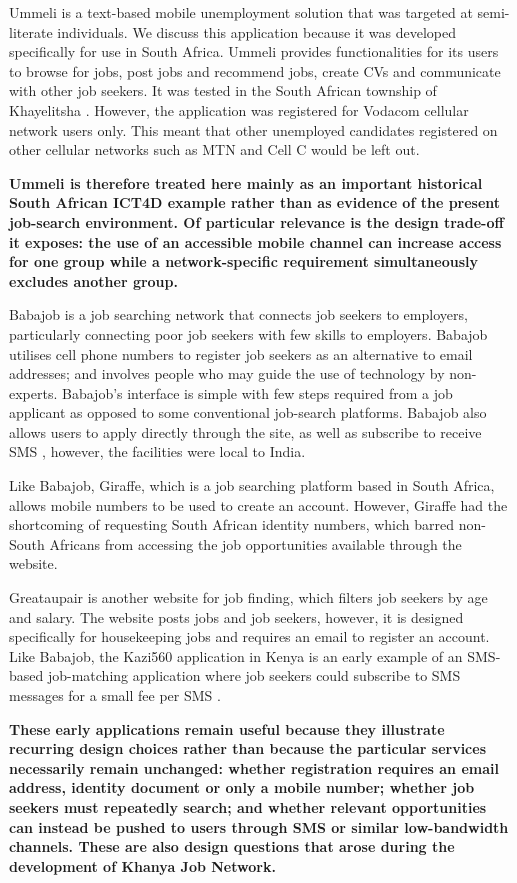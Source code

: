 Ummeli \cite{gitau2012} is a text-based mobile unemployment solution that was targeted at semi-literate individuals. We discuss this application because it was developed specifically for use in South Africa. Ummeli provides functionalities for its users to browse for jobs, post jobs and recommend jobs, create CVs and communicate with other job seekers. It was tested in the South African township of Khayelitsha \cite{gitau2012}. However, the application was registered for Vodacom cellular network users only. This meant that other unemployed candidates registered on other cellular networks such as MTN and Cell C would be left out.

\textbf{Ummeli is therefore treated here mainly as an important historical South African ICT4D example rather than as evidence of the present job-search environment. Of particular relevance is the design trade-off it exposes: the use of an accessible mobile channel can increase access for one group while a network-specific requirement simultaneously excludes another group.}

Babajob is a job searching network that connects job seekers to employers, particularly connecting poor job seekers with few skills to employers. Babajob utilises cell phone numbers to register job seekers as an alternative to email addresses; and involves people who may guide the use of technology by non-experts. Babajob’s interface is simple with few steps required from a job applicant as opposed to some conventional job-search platforms. Babajob also allows users to apply directly through the site, as well as subscribe to receive SMS \cite{babajob2016}, however, the facilities were local to India.

Like Babajob, Giraffe, which is a job searching platform based in South Africa, allows mobile numbers to be used to create an account. However, Giraffe had the shortcoming of requesting South African identity numbers, which barred non-South Africans from accessing the job opportunities available through the website.

Greataupair is another website for job finding, which filters job seekers by age and salary. The website posts jobs and job seekers, however, it is designed specifically for housekeeping jobs and requires an email to register an account. Like Babajob, the Kazi560 application in Kenya is an early example of an SMS-based job-matching application where job seekers could subscribe to SMS messages for a small fee per SMS \cite{qiang2012}.

\textbf{These early applications remain useful because they illustrate recurring design choices rather than because the particular services necessarily remain unchanged: whether registration requires an email address, identity document or only a mobile number; whether job seekers must repeatedly search; and whether relevant opportunities can instead be pushed to users through SMS or similar low-bandwidth channels. These are also design questions that arose during the development of Khanya Job Network.}

